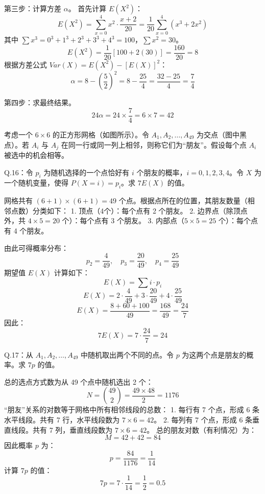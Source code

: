 \begin{questions}
\begin{solution}
第三步：计算方差 $\alpha$。
首先计算 $E(X^2)$：
\[
E(X^2) = \sum_{x=0}^{4} x^2 \cdot \frac{x+2}{20} = \frac{1}{20} \sum_{x=0}^{4} (x^3 + 2x^2)
\]
其中 $\sum x^3 = 0^3+1^3+2^3+3^3+4^3 = 100$，$\sum x^2 = 30$。
\[
E(X^2) = \frac{1}{20} [100 + 2(30)] = \frac{160}{20} = 8
\]
根据方差公式 $Var(X) = E(X^2) - [E(X)]^2$：
\[
\alpha = 8 - \left( \frac{5}{2} \right)^2 = 8 - \frac{25}{4} = \frac{32-25}{4} = \frac{7}{4}
\]

第四步：求最终结果。
\[
24\alpha = 24 \times \frac{7}{4} = 6 \times 7 = 42
\]
\end{solution}

\question
考虑一个 $6 \times 6$ 的正方形网格（如图所示）。令 $A_1, A_2, \dots, A_{49}$ 为交点（图中黑点）。若 $A_i$ 与 $A_j$ 在同一行或同一列上相邻，则称它们为“朋友”。假设每个点 $A_i$ 被选中的机会相等。

Q.16：令 $p_i$ 为随机选择的一个点恰好有 $i$ 个朋友的概率，$i = 0, 1, 2, 3, 4$。令 $X$ 为一个随机变量，使得 $P(X=i) = p_i$。求 $7E(X)$ 的值。

\begin{solution}
网格共有 $(6+1) \times (6+1) = 49$ 个点。根据点所在的位置，其朋友数量（相邻点数）分类如下：
1. 顶点（4个）：每个点有 2 个朋友。
2. 边界点（除顶点外，共 $4 \times 5 = 20$ 个）：每个点有 3 个朋友。
3. 内部点（$5 \times 5 = 25$ 个）：每个点有 4 个朋友。

由此可得概率分布：
\[
p_2 = \frac{4}{49}, \quad p_3 = \frac{20}{49}, \quad p_4 = \frac{25}{49}
\]
期望值 $E(X)$ 计算如下：
\[
E(X) = \sum i \cdot p_i
\]
\[
E(X) = 2 \cdot \frac{4}{49} + 3 \cdot \frac{20}{49} + 4 \cdot \frac{25}{49}
\]
\[
E(X) = \frac{8 + 60 + 100}{49} = \frac{168}{49} = \frac{24}{7}
\]
因此：
\[
7E(X) = 7 \cdot \frac{24}{7} = 24
\]
\end{solution}

\question
Q.17：从 $A_1, A_2, \dots, A_{49}$ 中随机取出两个不同的点。令 $p$ 为这两个点是朋友的概率。求 $7p$ 的值。

\begin{solution}
总的选点方式数为从 49 个点中随机选出 2 个：
\[
N = \binom{49}{2} = \frac{49 \times 48}{2} = 1176
\]
“朋友”关系的对数等于网格中所有相邻线段的总数：
1. 每行有 7 个点，形成 6 条水平线段。共有 7 行，水平线段数为 $7 \times 6 = 42$。
2. 每列有 7 个点，形成 6 条垂直线段。共有 7 列，垂直线段数为 $7 \times 6 = 42$。
总的朋友对数（有利情况）为：
\[
M = 42 + 42 = 84
\]
因此概率 $p$ 为：
\[
p = \frac{84}{1176} = \frac{1}{14}
\]
计算 $7p$ 的值：
\[
7p = 7 \cdot \frac{1}{14} = \frac{1}{2} = 0.5
\]
\end{solution}


\end{questions}
